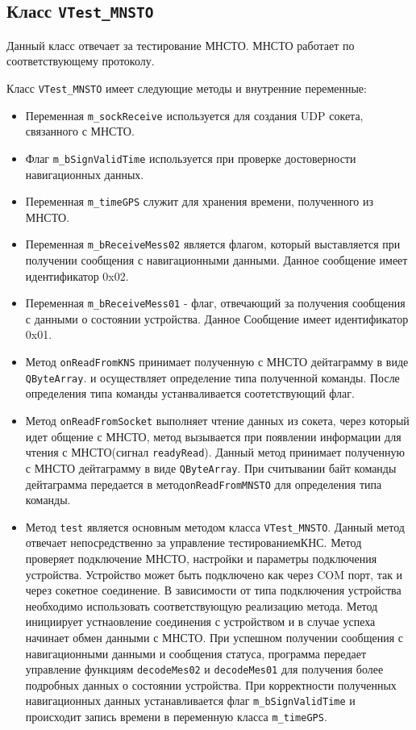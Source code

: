 \subsection{Класс \texttt{VTest\_MNSTO}}
Данный класс отвечает за тестирование МНСТО. МНСТО работает по соответствующему протоколу.

Класс \texttt{VTest\_MNSTO} имеет следующие методы и внутренние переменные:
\begin{itemize}
	\item Переменная \texttt{m\_sockReceive} используется для создания UDP сокета, связанного с МНСТО.

	\item Флаг \texttt{m\_bSignValidTime} используется при проверке достоверности навигационных данных.

	\item Переменная \texttt{m\_timeGPS} служит для хранения времени, полученного из МНСТО.

	\item Переменная \texttt{m\_bReceiveMess02} является флагом, который выставляется при получении сообщения с
		навигационными данными. Данное сообщение имеет идентификатор 0x02.

	\item Переменная \texttt{m\_bReceiveMess01} - флаг, отвечающий за получения сообщения с данными о состоянии
		устройства.
		Данное Сообщение имеет идентификатор 0x01.

	\item Метод \texttt{onReadFromKNS} принимает полученную с МНСТО дейтаграмму в виде \texttt{QByteArray}.
		и осуществляет определение типа полученной команды. После определения типа команды устанваливается
		соотетствующий флаг.

	\item Метод \texttt{onReadFromSocket} выполняет чтение данных из сокета, через который идет общение с МНСТО,
		метод вызывается при появлении информации для чтения с МНСТО(сигнал \texttt{readyRead}).
		Данный метод принимает полученную с МНСТО дейтаграмму в виде \texttt{QByteArray}.
		При считывании байт команды дейтаграмма передается в метод\break \texttt{onReadFromMNSTO} для определения типа
		команды.

	\item Метод \texttt{test} является основным методом класса \texttt{VTest\_MNSTO}. Данный метод отвечает
		непосредственно за управление тестированием\break КНС. Метод проверяет подключение МНСТО, настройки и
		параметры подключения устройства. Устройство может быть подключено как через COM порт, так и через
		сокетное соединение. В зависимости от типа подключения устройства необходимо использовать
		соответствующую реализацию метода. Метод инициирует устнаовление соединения с устройством и в случае
		успеха начинает обмен данными с МНСТО. При успешном получении сообщения с навигационными данными и сообщения
		статуса, программа передает управление функциям \texttt{decodeMes02} и \texttt{decodeMes01} для
		получения более подробных данных о состоянии устройства. При корректности полученных навигационных
		данных устанавливается флаг \texttt{m\_bSignValidTime} и происходит запись времени в переменную класса
		\texttt{m\_timeGPS}.


\end{itemize}
